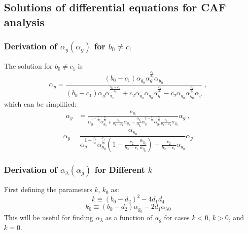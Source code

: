\subsection{Solutions of differential equations for CAF analysis}
\subsubsection{Derivation of \texorpdfstring{$\alpha_y(\alpha_g)$}{alpha-y(alpha-g)} for \texorpdfstring{$b_0\neq c_1$}{b0 != c1}}
The solution for $b_0\neq c_1$ is
\begin{equation*}
    \alpha_y=\frac{(b_0-c_1)\alpha_{g_0}\alpha_g^{\frac{c_1}{b_0}}\alpha_{y_0}}{ (b_0-c_1)\alpha_g\alpha_{g_0}^{\frac{b_0+c_1}{b_0}}+{c_2}\alpha_{y_0}{\alpha_{g_0}}\alpha_g^{\frac{c_1}{b_0}}-c_2\alpha_{y_0}\alpha_{g_0}^{\frac{c_1}{b_0}}\alpha_{g}}\;,
\end{equation*}
which can be simplified:
\begin{align*}
    \alpha_y&=\frac{\alpha_{y_0}}{ \alpha_g^{1-\frac{c_1}{b_0}}\alpha_{g_0}^{\frac{c_1}{b_0}}+\frac{c_2}{b_0-c_1}\alpha_{y_0}-\frac{\alpha_{y_0}}{\alpha_{g_0}}\alpha_g^{1-\frac{c_1}{b_0}}\alpha_{g_0}^{\frac{c_1}{b_0}}\frac{c_2}{b_0-c_1}\alpha_{y_0} }\alpha_g\;,
\end{align*}
\begin{equation}
    \boxed{\alpha_y=\frac{\alpha_{y_0}}{ \alpha_g^{1-\frac{c_1}{b_0}}\alpha_{g_0}^{\frac{c_1}{b_0}}\left(1-\frac{c_2}{b_0-c_1}\frac{\alpha_{y_0}}{\alpha_{g_0}}\right)+\frac{c_2}{b_0-c_1}\alpha_{y_0} }\alpha_g}
    \label{eq:alphay}
\end{equation}
\subsubsection{Derivation of \texorpdfstring{$\alpha_\lambda(\alpha_g)$}{alpha-lambda (alpha-g)} for Different \texorpdfstring{$k$}{k}}
First defining the parameters $k,\,k_0$ as:
\[
 k \equiv (b_0 - d_2)^2 - 4d_1 d_4
\]
\[
k_0 \equiv (b_0 - d_2)\alpha_{g_0} - 2d_1\alpha_{\lambda0}
\]
This will be useful for finding $\alpha_\lambda$ as a function of $\alpha_g$ for cases $k<0$, $k>0$, and $k=0$.
